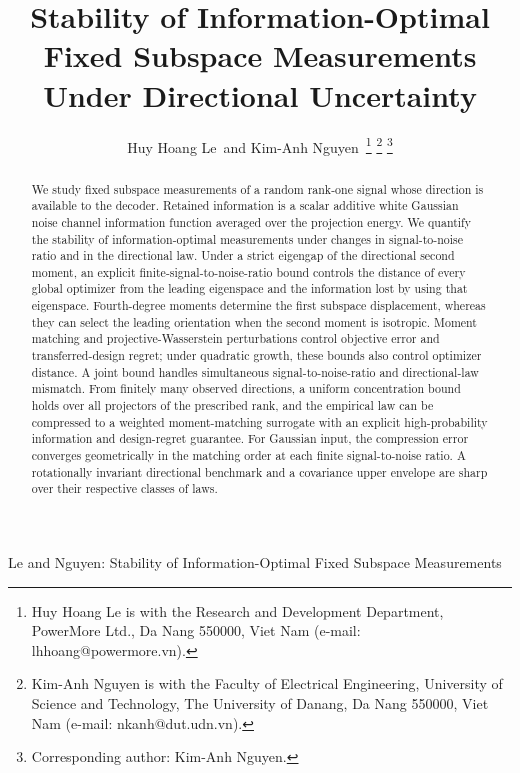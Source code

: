 \documentclass[lettersize,onecolumn]{IEEEtran}
\theoremstyle{remark}
\theoremstyle{definition}
\begin{document}
\title{Stability of Information-Optimal Fixed Subspace Measurements Under Directional Uncertainty}

\author{Huy Hoang Le\, and Kim-Anh Nguyen\,%
\thanks{Huy Hoang Le is with the Research and Development Department, PowerMore Ltd., Da Nang 550000, Viet Nam (e-mail: lhhoang@powermore.vn).}%
\thanks{Kim-Anh Nguyen is with the Faculty of Electrical Engineering, University of Science and Technology, The University of Danang, Da Nang 550000, Viet Nam (e-mail: nkanh@dut.udn.vn).}%
\thanks{Corresponding author: Kim-Anh Nguyen.}}

%
{Le and Nguyen: Stability of Information-Optimal Fixed Subspace Measurements}

\maketitle

\begin{abstract}
We study fixed subspace measurements of a random rank-one signal whose direction is available to the decoder. Retained information is a scalar additive white Gaussian noise channel information function averaged over the projection energy. We quantify the stability of information-optimal measurements under changes in signal-to-noise ratio and in the directional law. Under a strict eigengap of the directional second moment, an explicit finite-signal-to-noise-ratio bound controls the distance of every global optimizer from the leading eigenspace and the information lost by using that eigenspace. Fourth-degree moments determine the first subspace displacement, whereas they can select the leading orientation when the second moment is isotropic. Moment matching and projective-Wasserstein perturbations control objective error and transferred-design regret; under quadratic growth, these bounds also control optimizer distance. A joint bound handles simultaneous signal-to-noise-ratio and directional-law mismatch. From finitely many observed directions, a uniform concentration bound holds over all projectors of the prescribed rank, and the empirical law can be compressed to a weighted moment-matching surrogate with an explicit high-probability information and design-regret guarantee. For Gaussian input, the compression error converges geometrically in the matching order at each finite signal-to-noise ratio. A rotationally invariant directional benchmark and a covariance upper envelope are sharp over their respective classes of laws.
\end{abstract}
\end{document}
